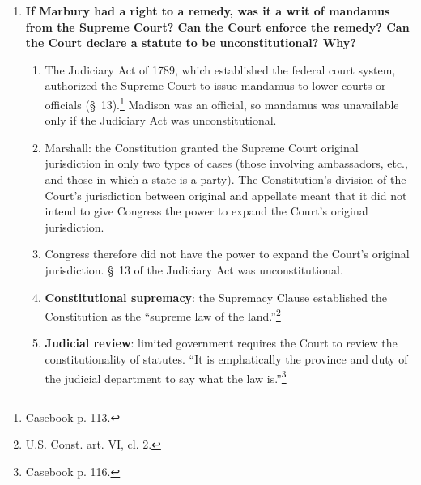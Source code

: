 \begin{enumerate}
\begin{enumerate}
\begin{enumerate}
{            p. 111.} Compare to Louis XIV: ``The State, it is I.''
            \item The question of whether an officer has a vested right in his 
            appointment, and therefore whether the President can remove him at 
            will, is for the courts. Therefore the courts can review Marbury's 
            dispute.
            \item Whether a right is vested is a question for the courts to 
            decide. Cf. the political question doctrine.
        \end{enumerate}
        \item \textbf{If Marbury had a right to a remedy, was it a writ of mandamus 
        from the Supreme Court? Can the Court enforce the remedy? Can the 
        Court declare a statute to be unconstitutional? Why?}
        \begin{enumerate}
            \item The Judiciary Act of 1789, which established the federal 
            court system, authorized the Supreme Court to issue mandamus to 
            lower courts or officials (\S\ 13).\footnote{Casebook p. 113.}
            Madison was an official, so mandamus was unavailable only if the 
            Judiciary Act was unconstitutional.
            \item Marshall: the Constitution granted the Supreme Court 
            original jurisdiction in only two types of cases (those involving 
            ambassadors, etc., and those in which a state is a party). The 
            Constitution's division of the Court's jurisdiction between 
            original and appellate meant that it did not intend to give 
            Congress the power to expand the Court's original jurisdiction.
            \item Congress therefore did not have the power to expand the 
            Court's original jurisdiction. \S\ 13 of the Judiciary Act was 
            unconstitutional.
            \item \textbf{Constitutional supremacy}: the Supremacy Clause 
            established the Constitution as the ``supreme law of the 
            land.''\footnote{U.S. Const. art. VI, cl. 2.}
            \item \textbf{Judicial review}: limited government requires the 
            Court to review the constitutionality of statutes. ``It is 
            emphatically the province and duty of the judicial department to 
            say what the law is.''\footnote{Casebook p. 116.}
        \end{enumerate}
    \end{enumerate}
\end{enumerate}
